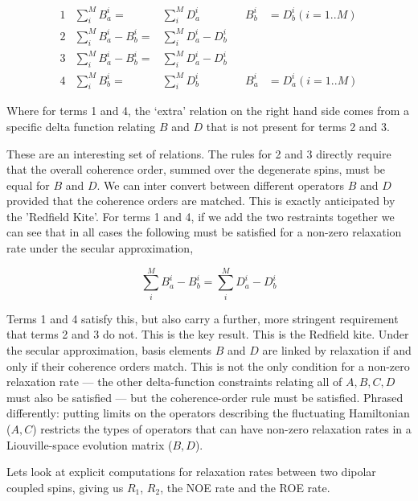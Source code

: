\documentclass[notitlepage,11pt]{article}
\begin{document}
\begin{equation}
\begin{array}{lrlcrl}
1 & \sum_i^M B_a^{i} =& \sum_i^M D_a^{i}  &  & B_b^i& =D_b^i (i=1..M)\\
2 & \sum_i^M  B_a^{i}-B_b^{i}=&\sum_i^M D_a^{i}-D_b^{i}  & & &\\
3 & \sum_i^M  B_a^{i}-B_b^{i}=&\sum_i^MD_a^{i}-D_b^{i}  & & &\\
4 & \sum_i^M B_b^{i} =& \sum_i^M D_b^{i}  &  & B_a^i & = D_a^i (i=1..M)
\end{array}
\end{equation}

Where for terms 1 and 4, the `extra' relation on the right hand side comes from a specific delta function relating $B$ and $D$ that is not present for terms 2 and 3. 

These are an interesting set of relations. The rules for 2 and 3 directly require that the overall coherence order, summed over the degenerate spins, must be equal for $B$ and $D$. We can inter convert between different operators $B$ and $D$ provided that the coherence orders are matched. This is exactly anticipated by the 'Redfield Kite'. For terms 1 and 4, if we add the two restraints together we can see that in all cases the following must be satisfied for a non-zero relaxation rate under the secular approximation,

\begin{equation}
\sum_i^M  B_a^{i}-B_b^{i}=\sum_i^M D_a^{i}-D_b^{i} 
\end{equation}

Terms 1 and 4 satisfy this, but also carry a further, more stringent requirement that terms 2 and 3 do not. This is the key result. This is the Redfield kite. Under the secular approximation, basis elements $B$ and $D$ are linked by relaxation if and only if their coherence orders match. This is not the only condition for a non-zero relaxation rate — the other delta-function constraints relating all of $A,B,C,D$ must also be satisfied — but the coherence-order rule must be satisfied. Phrased differently: putting limits on the operators describing the fluctuating Hamiltonian ($A,C$) restricts the types of operators that can have non-zero relaxation rates in a Liouville-space evolution matrix ($B,D$).

Lets look at explicit computations for relaxation rates between two dipolar coupled spins, giving us $R_1$, $R_2$, the NOE rate and the ROE rate.
\end{document}
